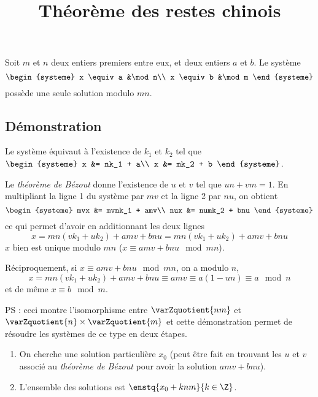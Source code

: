 \documentclass[fontsize=12pt,twoside=false,parskip=half, french]{scrartcl}
\title{Théorème des restes chinois}
\date{}
\author{}
\begin{document}
\maketitle
   \begin{Theoreme}
      Soit $m$ et $n$ deux entiers premiers entre eux, et deux entiers $a$ et $b$. Le système
      \[
         \begin{systeme}
            x \equiv a &\mod n\\
            x \equiv b &\mod m
         \end{systeme}
      \]
      possède une seule solution modulo $mn$.
   \end{Theoreme}
   \subsection{Démonstration}
      Le système équivaut à l’existence de $k_1$ et $k_2$ tel que
      $\begin{systeme}
            x &= nk_1 + a\\
            x &= mk_2 + b
         \end{systeme}$.
         
      Le \emph{théorème de Bézout} donne l’existence de $u$ et $v$ tel que $un + vm = 1$. En multipliant la ligne 1 du 
      système par $mv$ et la ligne 2 par $nu$, on obtient
      \[
         \begin{systeme}
            mvx &= mvnk_1 + amv\\
            nux &= numk_2 + bnu
         \end{systeme}
      \]
      ce qui permet d’avoir en additionnant les deux lignes
      \[
         x = mn(vk_1 + uk_2) + amv + bnu = mn(vk_1 + uk_2) + amv + bnu
      \]
      $x$ bien est unique modulo $mn$ ($x \equiv amv + bnu \mod mn$).
      
 
      Réciproquement, si $x \equiv amv + bnu \mod mn$, on a modulo $n$,
      \[
         x = mn(vk_1 + uk_2) + amv + bnu \equiv amv \equiv a(1 - un) \equiv a \mod n 
      \]
      et de même $x \equiv b \mod m$.
      
      PS : ceci montre l’isomorphisme entre $\varZquotient{nm}$ et $\varZquotient{n} \times \varZquotient{m}$
      et cette démonstration permet de résoudre les systèmes de ce type en deux étapes.
      \begin{enumerate}
         \item On cherche une solution particulière $x_0$ (peut être fait en trouvant les $u$ et $v$ associé au
               \emph{théorème de Bézout} pour avoir la solution $amv + bnu$).
         \item L’ensemble des solutions est $\enstq{x_0 + knm}{k \in \Z}$.
      \end{enumerate}
\end{document}
